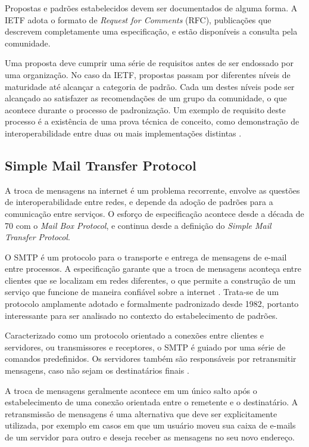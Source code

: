 Propostas e padrões estabelecidos devem ser documentados de alguma forma. A IETF
adota o formato de \textit{Request for Comments} (RFC), publicações que descrevem
completamente uma especificação, e estão disponíveis a consulta pela comunidade.

Uma proposta deve cumprir uma série de requisitos antes de ser endossado por uma
organização. No caso da IETF, propostas passam por diferentes níveis de maturidade
até alcançar a categoria de padrão. Cada um destes níveis pode ser alcançado ao
satisfazer as recomendações de um grupo da comunidade, o que acontece durante o
processo de padronização. Um exemplo de requisito deste processo é a existência de
uma prova técnica de conceito, como demonstração de interoperabilidade entre duas ou
mais implementações distintas \cite{rfc1280}.


\subsection{Simple Mail Transfer Protocol}

A troca de mensagens na internet é um problema recorrente, envolve as questões de
interoperabilidade entre redes, e depende da adoção de padrões para a comunicação
entre serviços. O esforço de especificação acontece desde a década de 70 com o
\textit{Mail Box Protocol}, e continua desde a definição do \textit{Simple Mail
Transfer Protocol}.

O SMTP é um protocolo para o transporte e entrega de mensagens de e-mail entre
processos. A especificação garante que a troca de mensagens aconteça entre clientes
que se localizam em redes diferentes, o que permite a construção de um serviço que
funcione de maneira confiável sobre a internet \cite{rfc2821}. Trata-se de um
protocolo amplamente adotado e formalmente padronizado desde 1982, portanto
interessante para ser analisado no contexto do estabelecimento de padrões.

Caracterizado como um protocolo orientado a conexões entre clientes e servidores, ou
transmissores e receptores, o SMTP é guiado por uma série de comandos predefinidos.
Os servidores também são responsáveis por retransmitir mensagens, caso não sejam os
destinatários finais \cite{kurose2012}.

A troca de mensagens geralmente acontece em um único salto após o estabelecimento de
uma conexão orientada entre o remetente e o destinatário. A retransmissão de
mensagens é uma alternativa que deve ser explicitamente utilizada, por exemplo em
casos em que um usuário moveu sua caixa de e-mails de um servidor para outro e
deseja receber as mensagens no seu novo endereço.

